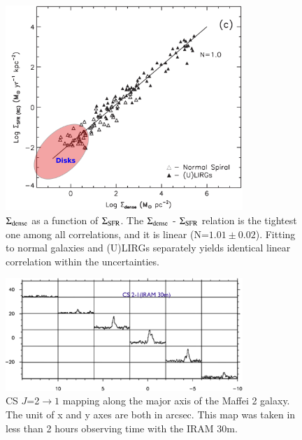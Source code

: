 \documentclass[legal,11pt]{article}
\begin{document}
\begin{figure}
\centering
\includegraphics[width=0.8\textwidth]{HCN_IR.png}
\caption{${\rm \Sigma_{dense}}$ as a function of $\Sigma_{\rm SFR}$. The ${\rm \Sigma_{dense}}$ 
        - $\Sigma_{\rm SFR}$ relation is the tightest one among all correlations, 
        and it is linear (N=$1.01 \pm 0.02$). Fitting to normal galaxies and (U)LIRGs separately 
yields identical linear correlation within the uncertainties.} 
\label{fig:hcn-ir}
\end{figure}






\begin{figure}
\centering

\includegraphics[width=0.8\textwidth]{maffei2-1.eps}

\caption{CS $J$=2$\rightarrow 1$ mapping along the major axis of the
Maffei 2 galaxy.  The unit of x and y axes are both in arcsec. This map
was taken in less than 2 hours observing time with the IRAM 30m.}
\label{fig:maffei2}
\end{figure}
\end{document}
